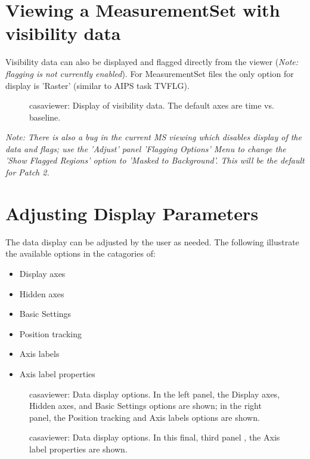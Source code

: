 \section{Viewing a MeasurementSet with visibility data}
\label{section:view.MS}

Visibility data can also be displayed and flagged directly from the
viewer ({\it Note: flagging is not currently enabled}). For
MeasurementSet files the only option for display is 'Raster' (similar
to AIPS task TVFLG).

\begin{figure}[h!]
\caption{\label{fig:viewer_ms1} casaviewer: Display of visibility
  data. The default axes are time vs. baseline.} 
\hrulefill
\end{figure}
 

{\it Note: There is also a bug in the current MS viewing which
disables display of the data and flags; use the 'Adjust' panel
'Flagging Options' Menu to change the 'Show Flagged Regions' option to
'Masked to Background'. This will be the default for Patch 2.}

\section{Adjusting Display Parameters}
\label{section:view.adjust}

The data display can be adjusted by the user as needed. The following
illustrate the available options in the catagories of: 
\begin{itemize}
   \item Display axes
   \item Hidden axes
   \item Basic Settings
   \item Position tracking
   \item Axis labels
   \item Axis label properties
\end{itemize}

\begin{figure}[h!]
\caption{\label{fig:datadisplay} casaviewer: Data display options. In
  the left panel, the Display axes, Hidden axes, and Basic Settings
  options are shown; in the right panel, the Position tracking and
  Axis labels options are shown. }

\end{figure}
\begin{figure}[h!]
\caption{\label{fig:datadisplay-p3} casaviewer: Data display options. In
  this final, third panel , the Axis label properties are shown. }
\hrulefill
\end{figure}
 

